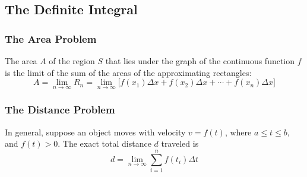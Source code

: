 \subsection{The Definite Integral}

\subsubsection*{The Area Problem}
\begin{definition}
    The area \(A\) of the region \(S\) that lies under the graph of the
    continuous function \(f\) is the limit of the sum of the areas of the
    approximating rectangles:
    \[A=\lim_{n\to\infty}R_n
    =\lim_{n\to\infty}\big[f(x_1)\Delta x+f(x_2)\Delta x+\cdots
    +f(x_n)\Delta x\big]\]
\end{definition}

\subsubsection*{The Distance Problem}
In general, suppose an object moves with velocity \(v=f(t)\), where
\(a\leq t\leq b\), and \(f(t)>0\).
The exact total distance \(d\) traveled is
\[d=\lim_{n\to\infty}\sum_{i=1}^n f(t_i)\Delta t\]

